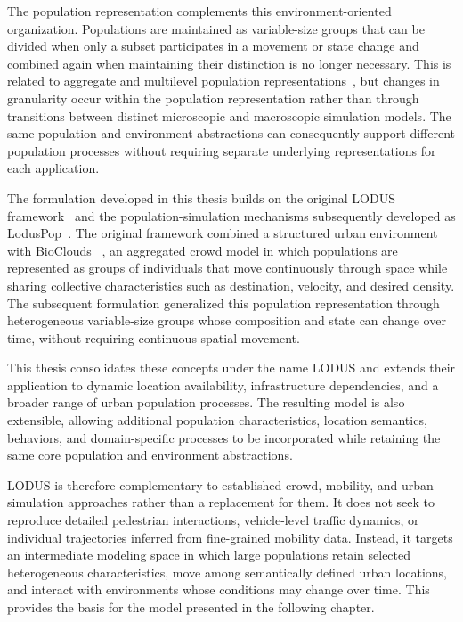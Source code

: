 The population representation complements this environment-oriented organization. Populations are maintained as variable-size groups that can be divided when only a subset participates in a movement or state change and combined again when maintaining their distinction is no longer necessary. This is related to aggregate and multilevel population representations~\cite{antonitsch2019bioclouds,legion,xiong2010hybrid,dang2023multilevelCrowd}, but changes in granularity occur within the population representation rather than through transitions between distinct microscopic and macroscopic simulation models. The same population and environment abstractions can consequently support different population processes without requiring separate underlying representations for each application.

The formulation developed in this thesis builds on the original LODUS framework~\cite{silva2020lodus} and the population-simulation mechanisms subsequently developed as LodusPop~\cite{silva2026lodusPop}. The original framework combined a structured urban environment with BioClouds~\cite{antonitsch2019bioclouds}%
, an aggregated crowd model in which populations are represented as groups of individuals that move continuously through space while sharing collective characteristics such as destination, velocity, and desired density. The subsequent formulation generalized this population representation through heterogeneous variable-size groups whose composition and state can change over time, without requiring continuous spatial movement. 

This thesis consolidates these concepts under the name LODUS and extends their application to dynamic location availability, infrastructure dependencies, and a broader range of urban population processes. The resulting model is also extensible, allowing additional population characteristics, location semantics, behaviors, and domain-specific processes to be incorporated while retaining the same core population and environment abstractions.

LODUS is therefore complementary to established crowd, mobility, and urban simulation approaches rather than a replacement for them. It does not seek to reproduce detailed pedestrian interactions, vehicle-level traffic dynamics, or individual trajectories inferred from fine-grained mobility data. Instead, it targets an intermediate modeling space in which large populations retain selected heterogeneous characteristics, move among semantically defined urban locations, and interact with environments whose conditions may change over time. This provides the basis for the model presented in the following chapter.